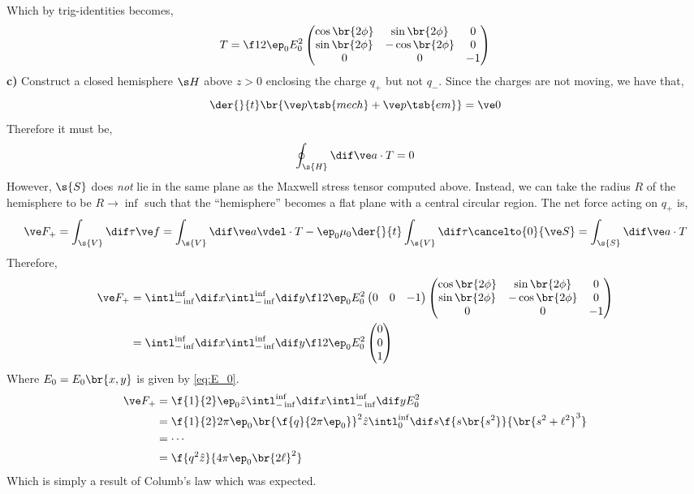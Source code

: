 \documentclass{article}
\begin{document}
Which by trig-identities becomes,
\[ T = \f12\ep_0 E_0^2 \begin{pmatrix}
    \cos\br{2\phi} & \sin \br{2\phi} & 0 \\
    \sin \br{2\phi} & -\cos\br{2\phi} & 0 \\
    0 & 0 & - 1 \\
\end{pmatrix} \]
\textbf{c)} Construct a closed hemisphere $\s H$ above $z > 0$ enclosing the charge $q_{+}$ but not $q_{-}$. Since the charges are not moving, we have that,
\[ \der{}{t} \br{\ve p\tsb{mech} + \ve p\tsb{em}} = \ve 0 \]
Therefore it must be,
\[ \oint_{\s{H}} \dif \ve a \cdot T = 0 \]
However, $\s{S}$ does \textit{not} lie in the same plane as the Maxwell stress tensor computed above. Instead, we can take the radius $R$ of the hemisphere to be $R \to \inf$ such that the ``hemisphere'' becomes a flat plane with a central circular region. The net force acting on $q_{+}$ is,
\[ \ve F_{+} = \int_{\s{V}} \dif \tau \ve f = \int_{\s{V}} \dif \ve a  \vdel \cdot T - \ep_0 \mu_0 \der{}{t} \int_{\s{V}} \dif \tau \cancelto{0}{\ve S} = \int_{\s{S}} \dif \ve a \cdot T \]
Therefore,
\begin{align*}
    \ve F_{+} &= \intl_{-\inf}^{\inf} \dif x \intl_{-\inf}^{\inf} \dif y \f12\ep_0 E_0^2 \begin{pmatrix}
        0 & 0 & -1
    \end{pmatrix} \begin{pmatrix}
        \cos\br{2\phi} & \sin \br{2\phi} & 0 \\
        \sin \br{2\phi} & -\cos\br{2\phi} & 0 \\
        0 & 0 & - 1 \\
    \end{pmatrix}\\
    &= \intl_{-\inf}^{\inf} \dif x \intl_{-\inf}^{\inf} \dif y \f12\ep_0 E_0^2 \begin{pmatrix}
        0 \\ 0 \\ 1
    \end{pmatrix}
\end{align*}
Where $E_0 = E_0\br{x,y}$ is given by \cref{eq:E_0}.
\begin{align*}
\ve F_{+} &= \f{1}{2} \ep_0 \hat z \intl_{-\inf}^{\inf} \dif x \intl_{-\inf}^{\inf} \dif y E_0^2 \\
&= \f{1}{2} 2 \pi \ep_0 \br{\f{q}{2 \pi \ep_0}}^2 \hat z \intl_{0}^{\inf} \dif s \f{s \br{s^2}}{\br{s^2+ \ell^2}^{3}} \\
&= \cdots \\
&= \f{q^2 \hat z}{4 \pi \ep_0 \br{2 \ell}^2}
\end{align*}
Which is simply a result of Columb's law which was expected.
\end{document}
